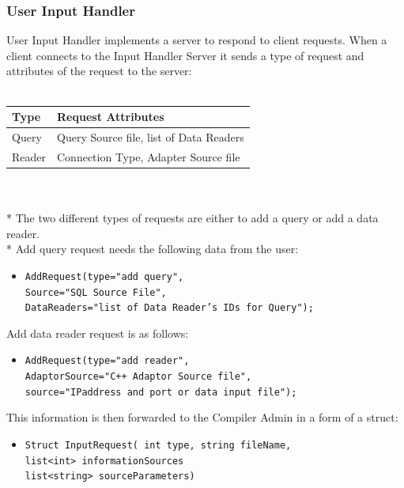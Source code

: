 \documentclass[14pt]{article}
\begin{document}
\subsubsection{User Input Handler}
User Input Handler implements a server to respond to client requests. When a client connects to the Input Handler Server it sends a type of request and attributes of the request to the server:
\\
\\
\begin{tabular}{|l|l|}
  \hline
  Type & Request Attributes \\ \hline
  Query & Query Source file, list of Data Readers \\ \hline
  Reader & Connection Type, Adapter Source file \\ \hline
\end{tabular}
\\
\\*
The two different types of requests are either to add a query or add a data reader.
\\*
Add query request needs the following data from the user:

\begin{itemize}
	\item {\tt AddRequest(type="add query",\\
		 Source="SQL Source File",\\
	     DataReaders="list of Data Reader's IDs for Query");}
\end{itemize}

\noindent Add data reader request is as follows:

\begin{itemize}
	\item {\tt AddRequest(type="add reader", \\
	     AdaptorSource="C++ Adaptor Source file",\\
	     source="IPaddress and port or data input file");}
\end{itemize}

This information is then forwarded to the Compiler Admin in a form of a struct:

\begin{itemize}
	\item {\tt Struct InputRequest( int type, string fileName,\\
	       list<int> informationSources \\
		   list<string> sourceParameters)}
\end{itemize}
\end{document}

